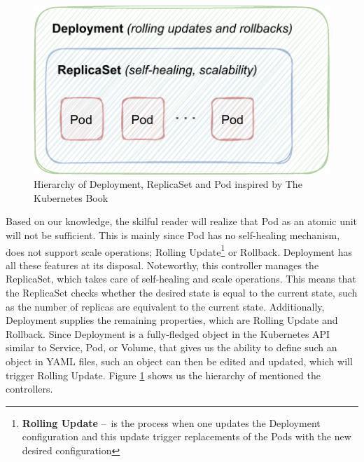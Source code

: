 \begin{enumerate}
    \begin{figure}[!htb]
        \centering
        \includegraphics[scale=1.2]{obrazky-figures/02-preliminaries/01-kubernetes/03-deplyoment-archite.pdf}
        \caption{Hierarchy of Deployment, ReplicaSet and Pod inspired by The Kubernetes Book \cite{kubernetesBook}}
        \label{fig:kubernetes:deploymentReplicaSetPod}
    \end{figure}
    Based on our knowledge, the skilful reader will realize that Pod as an atomic unit will not be sufficient. This is mainly since Pod has no self-healing mechanism, does not support scale operations; Rolling Update\footnote{\textbf{Rolling Update} \---\ is the process when one updates the Deployment configuration and this update trigger replacements of the Pods with the new desired configuration} or Rollback. Deployment has all these features at its disposal. Noteworthy, this controller manages the ReplicaSet, which takes care of self-healing and scale operations. This means that the ReplicaSet checks whether the desired state is equal to the current state, such as the number of replicas are equivalent to the current state. Additionally, Deployment supplies the remaining properties, which are Rolling Update and Rollback. Since Deployment is a fully-fledged object in the Kubernetes API similar to Service, Pod, or Volume, that gives us the ability to define such an object in YAML files, such an object can then be edited and updated, which will trigger Rolling Update. Figure \ref{fig:kubernetes:deploymentReplicaSetPod} shows us the hierarchy of mentioned the controllers. 
    

\end{enumerate}
